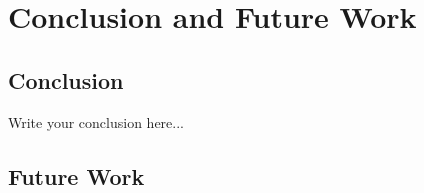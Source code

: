 \chapter{Conclusion and Future Work}
\label{chap:5}
\section{Conclusion}
Write your conclusion here...
\section{Future Work}